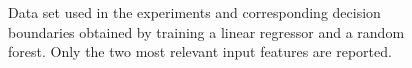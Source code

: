 \documentclass[sigconf]{acmart}
\begin{document}
\begin{figure}[h]
{	}
	\caption{Data set used in the experiments and corresponding decision boundaries obtained by training a linear regressor and a random forest. Only the two most relevant input features are reported.}\label{fig:dataPred}
\end{figure}

\begin{figure}[p]\centering
\end{figure}
\end{document}
